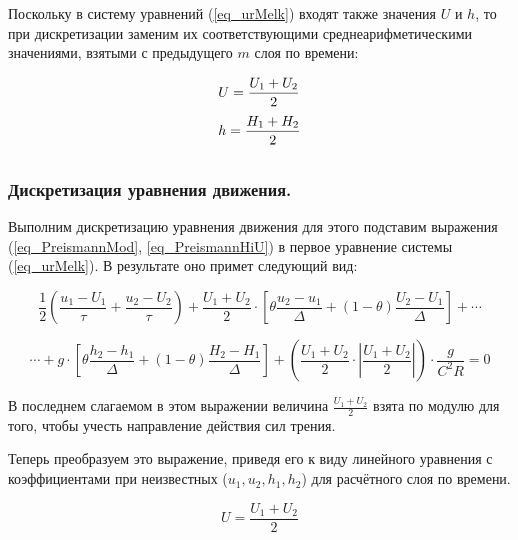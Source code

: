 Поскольку в систему уравнений (\ref{eq_urMelk}) входят также значения $ U $ и $ h $, то при дискретизации заменим их соответствующими среднеарифметическими значениями, взятыми с предыдущего $ m $ слоя по времени:

\begin{equation}
   \label{eq_PreismannHiU}
   \begin{array}{ll}
      \vspace{7pt}
      \displaystyle U = \frac{U_1 + U_2}{2}  \\
      \vspace{7pt}
      \displaystyle h = \frac{H_1 + H_2}{2} 
   \end{array} 
\end{equation}




\subsubsection{Дискретизация уравнения движения.}

Выполним дискретизацию уравнения движения для этого подставим выражения (\ref{eq_PreismannMod}, \ref{eq_PreismannHiU}) в первое уравнение системы (\ref{eq_urMelk}). В результате оно примет следующий вид:

$$
   \displaystyle \frac{1}{2} \left( \frac{u_1-U_1}{\tau} + \frac{u_2-U_2}{\tau} \right) + \frac{U_1+U_2}{2} \cdot \left[ \theta \frac{u_2 - u_1}{\Delta} + (1-\theta) \frac{U_2-U_1}{\Delta} \right] + \cdots   
$$

$$
   \displaystyle \cdots + g \cdot \left[ \theta \frac{h_2-h_1}{\Delta} + (1-\theta) \frac{H_2-H_1}{\Delta} \right] + \left( \frac{U_1+U_2}{2} \cdot \left| \frac{U_1+U_2}{2} \right| \right) \cdot \frac{g}{C^2R} = 0
$$

В последнем слагаемом в этом выражении величина $ \frac{U_1+U_2}{2} $ взята по модулю для того, чтобы учесть направление действия сил трения.

Теперь преобразуем это выражение, приведя его к виду линейного уравнения с коэффициентами при неизвестных ($ u_1, u_2, h_1, h_2 $) для расчётного слоя по времени.

$$
   \displaystyle U = \frac{U_1+U_2}{2}
$$


